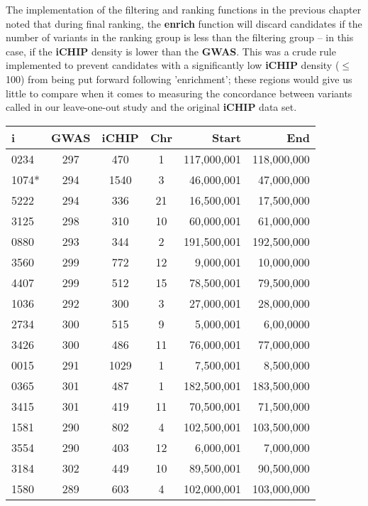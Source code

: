 The implementation of the filtering and ranking functions in the previous
chapter noted that during final ranking, the \textbf{enrich} function will
discard candidates if the number of variants in the ranking group is less than
the filtering group -- in this case, if the \textbf{iCHIP} density is lower than
the \textbf{GWAS}. This was a crude rule implemented to prevent candidates with
a significantly low \textbf{iCHIP} density ($\le$100) from being put forward following
'enrichment'; these regions would give us little to compare when it comes to
measuring the concordance between variants called in our leave-one-out study and
the original \textbf{iCHIP} data set.


\begin{table}[H]
    \centering
    \begin{tabular}{l | c  c  c  r  r}
        i & GWAS & iCHIP & Chr & Start & End \\
        \hline
        0234&297&470&1& 117,000,001 &  118,000,000\\
        1074*&294&1540&3&  46,000,001 &   47,000,000\\
        5222&294&336&21&  16,500,001 &   17,500,000\\
        3125&298&310&10&  60,000,001 &   61,000,000\\
        0880&293&344&2& 191,500,001 &  192,500,000\\
        3560&299&772&12&   9,000,001 &   10,000,000\\
        4407&299&512&15&  78,500,001 &   79,500,000\\
        1036&292&300&3&  27,000,001 &   28,000,000\\
        2734&300&515&9&   5,000,001&    6,00,0000\\
        3426&300&486&11&  76,000,001 &   77,000,000\\
        0015&291&1029&1&   7,500,001 &    8,500,000\\
        0365&301&487&1& 182,500,001 &  183,500,000\\
        3415&301&419&11&  70,500,001 &   71,500,000\\
        1581&290&802&4& 102,500,001 &  103,500,000\\
        3554&290&403&12&   6,000,001 &    7,000,000\\
        3184&302&449&10&  89,500,001 &   90,500,000\\
        1580&289&603&4& 102,000,001 &  103,000,000\\

\end{tabular}
\end{table}
